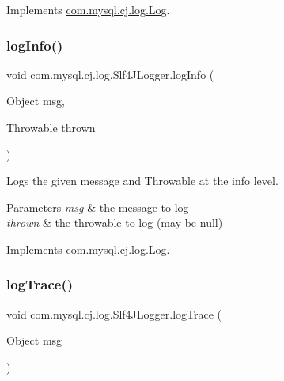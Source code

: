 Implements \mbox{\hyperlink{interfacecom_1_1mysql_1_1cj_1_1log_1_1_log_a7f117433067520dd682da12ff9194f4b}{com.\+mysql.\+cj.\+log.\+Log}}.

\mbox{\label{classcom_1_1mysql_1_1cj_1_1log_1_1_slf4_j_logger_ad6eaf1dfaaa8f7f4c7a092852a4add0f}} 
\subsubsection{\texorpdfstring{log\+Info()}{logInfo()}\hspace{0.1cm}{\footnotesize\ttfamily [2/2]}}
{\footnotesize\ttfamily void com.\+mysql.\+cj.\+log.\+Slf4\+J\+Logger.\+log\+Info (\begin{DoxyParamCaption}\item[{Object}]{msg,  }\item[{Throwable}]{thrown }\end{DoxyParamCaption})}

Logs the given message and Throwable at the \textquotesingle{}info\textquotesingle{} level.


\begin{DoxyParams}{Parameters}
{\em msg} & the message to log \\
\hline
{\em thrown} & the throwable to log (may be null) \\
\hline
\end{DoxyParams}


Implements \mbox{\hyperlink{interfacecom_1_1mysql_1_1cj_1_1log_1_1_log_abad2a5a44ff04b24bf46a58997e4f7da}{com.\+mysql.\+cj.\+log.\+Log}}.

\mbox{\label{classcom_1_1mysql_1_1cj_1_1log_1_1_slf4_j_logger_aa2d6ea6567c9c148b7170d771686386b}} 
\subsubsection{\texorpdfstring{log\+Trace()}{logTrace()}\hspace{0.1cm}{\footnotesize\ttfamily [1/2]}}
{\footnotesize\ttfamily void com.\+mysql.\+cj.\+log.\+Slf4\+J\+Logger.\+log\+Trace (\begin{DoxyParamCaption}\item[{Object}]{msg }\end{DoxyParamCaption})}

